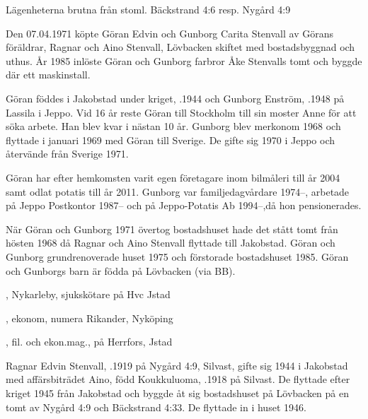 Lägenheterna brutna från stoml. Bäckstrand 4:6 resp. Nygård 4:9



Den 07.04.1971 köpte Göran Edvin och Gunborg Carita Stenvall av Görans föräldrar, Ragnar och Aino Stenvall,  Lövbacken skiftet med bostadsbyggnad och uthus. År 1985 inlöste Göran och Gunborg farbror Åke Stenvalls tomt och byggde där ett maskinstall.

Göran föddes i Jakobstad under kriget, .1944 och Gunborg Enström, .1948 på Lassila i Jeppo. Vid 16 år reste Göran till Stockholm till sin moster Anne för att söka arbete. Han blev kvar i nästan 10 år. Gunborg blev merkonom 1968 och flyttade i januari 1969 med Göran till Sverige. De gifte sig 1970 i Jeppo och återvände från Sverige 1971.

Göran har efter hemkomsten varit egen företagare inom bilmåleri till år 2004 samt odlat potatis till år 2011. Gunborg var familjedagvårdare 1974--, arbetade på Jeppo Postkontor 1987-- och på Jeppo-Potatis Ab 1994--,då hon pensionerades.

När Göran och Gunborg 1971 övertog bostadshuset hade det stått tomt från hösten 1968 då Ragnar och Aino Stenvall flyttade till Jakobstad. Göran och Gunborg grundrenoverade huset 1975 och förstorade bostadshuset 1985.
Göran och Gunborgs barn är födda på Lövbacken (via BB).
\begin{jhchildren}
  \item {}, Nykarleby, sjukskötare på Hvc Jstad
  \item {}, ekonom, numera Rikander, Nyköping
  \item {}, fil. och ekon.mag., på Herrfors, Jstad
\end{jhchildren}


Ragnar Edvin Stenvall, .1919 på Nygård 4:9, Silvast, gifte sig 1944 i Jakobstad med affärsbiträdet Aino, född Koukkuluoma, .1918 på Silvast. De flyttade efter kriget 1945 från Jakobstad	och byggde åt sig bostadshuset på Lövbacken på en tomt av Nygård 4:9 och Bäckstrand 4:33. De flyttade in i huset 1946.

